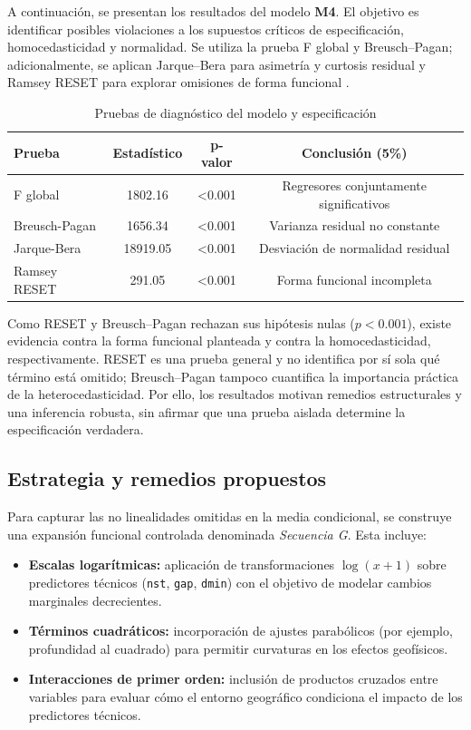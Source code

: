\documentclass{style}
\newcommand{\var}[1]{\texttt{#1}}
\begin{document}
A continuación, se presentan los resultados del modelo \textbf{M4}. El objetivo es identificar posibles violaciones a los supuestos críticos de especificación, homocedasticidad y normalidad. Se utiliza la prueba F global y Breusch--Pagan; adicionalmente, se aplican Jarque--Bera para asimetría y curtosis residual \cite{jarquebera1987} y Ramsey RESET para explorar omisiones de forma funcional \cite{ramsey1969}.

\begin{table}[H]
    \centering
    \caption{Pruebas de diagnóstico del modelo y especificación}
    \scriptsize
    \setlength{\tabcolsep}{16pt} 
    \begin{tabular}{lccc}
    \toprule
    \textbf{Prueba} & \textbf{Estadístico} & \textbf{p-valor} & \textbf{Conclusión (5\%)} \\
    \midrule
    F global & 1802.16 & <0.001 & Regresores conjuntamente significativos \\
    Breusch-Pagan & 1656.34 & <0.001 & Varianza residual no constante \\
    Jarque-Bera & 18919.05 & <0.001 & Desviación de normalidad residual \\
    Ramsey RESET & 291.05 & <0.001 & Forma funcional incompleta \\
    \bottomrule
    \end{tabular}
\end{table}


Como RESET y Breusch--Pagan rechazan sus hipótesis nulas ($p < 0.001$), existe evidencia contra la forma funcional planteada y contra la homocedasticidad, respectivamente. RESET es una prueba general y no identifica por sí sola qué término está omitido; Breusch--Pagan tampoco cuantifica la importancia práctica de la heterocedasticidad. Por ello, los resultados motivan remedios estructurales y una inferencia robusta, sin afirmar que una prueba aislada determine la especificación verdadera.

\subsection{Estrategia y remedios propuestos}

Para capturar las no linealidades omitidas en la media condicional, se construye una expansión funcional controlada denominada \textit{Secuencia G}. Esta incluye:

\begin{itemize}
    \item \textbf{Escalas logarítmicas:} aplicación de transformaciones $\log(x+1)$ sobre predictores técnicos (\var{nst}, \var{gap}, \var{dmin}) con el objetivo de modelar cambios marginales decrecientes.

    \item \textbf{Términos cuadráticos:} incorporación de ajustes parabólicos (por ejemplo, profundidad al cuadrado) para permitir curvaturas en los efectos geofísicos.

    \item \textbf{Interacciones de primer orden:} inclusión de productos cruzados entre variables para evaluar cómo el entorno geográfico condiciona el impacto de los predictores técnicos.
\end{itemize}
\end{document}
